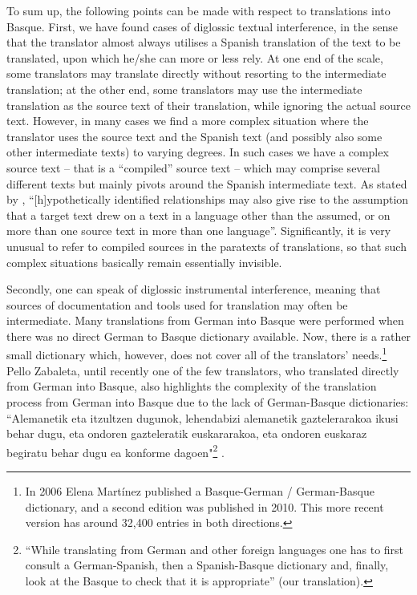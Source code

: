 \documentclass[output=paper]{LSP/langsci}
\begin{document}
To sum up, the following points can be made with respect to translations into Basque. First, we have found cases of diglossic textual interference, in the sense that the translator almost always utilises a Spanish translation of the text to be translated, upon which he/she can more or less rely. At one end of the scale, some translators may translate directly without resorting to the intermediate translation; at the other end, some translators may use the intermediate translation as the source text of their translation, while ignoring the actual source text. However, in many cases we find a more complex situation where the translator uses the source text and the Spanish text (and possibly also some other intermediate texts) to varying degrees. In such cases we have a complex source text – that is a “compiled” source text – which may comprise several different texts but mainly pivots around the Spanish intermediate text. As stated by \citep[72]{Toury1995}, “[h]ypothetically identified relationships may also give rise to the assumption that a target text drew on a text in a language other than the assumed, or on more than one source text in more than one language”. Significantly, it is very unusual to refer to compiled sources in the paratexts of translations, so that such complex situations basically remain essentially invisible.

Secondly, one can speak of diglossic instrumental interference, meaning that sources of documentation and tools used for translation may often be intermediate. Many translations from German into Basque were performed when there was no direct German to Basque dictionary available. Now, there is a rather small dictionary which, however, does not cover all of the translators’ needs.\footnote{In 2006 Elena Martínez published a Basque-German / German-Basque dictionary, and a second edition was published in 2010. This more recent version has around 32,400 entries in both directions.} Pello Zabaleta, until recently one of the few translators, who translated directly from German into Basque, also highlights the complexity of the translation process from German into Basque due to the lack of German-Basque dictionaries: “Alemanetik eta itzultzen dugunok, lehendabizi alemanetik gaztelerarakoa ikusi behar dugu, eta ondoren gazteleratik euskararakoa, eta ondoren euskaraz begiratu behar dugu ea konforme dagoen"\footnote{“While translating from German and other foreign languages one has to first consult a German-Spanish, then a Spanish-Basque dictionary and, finally, look at the Basque to check that it is appropriate” (our translation).} \citep{Zabaleta1995}.
\end{document}
